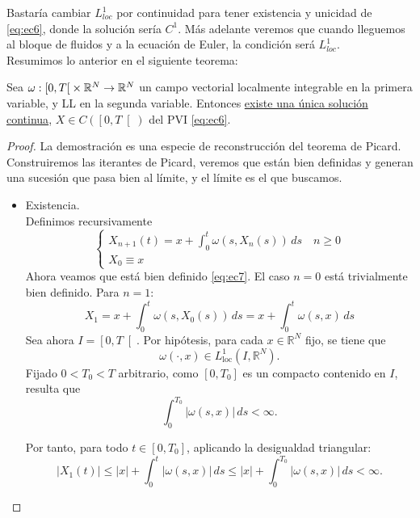 Bastaría cambiar $L^1_{loc}$ por continuidad para tener existencia y unicidad de \eqref{eq:ec6}, donde la solución sería $C^1$. Más adelante 
veremos que cuando lleguemos al bloque de fluidos y a la ecuación de Euler, la condición será $L^1_{loc}$. \\

Resumimos lo anterior en el siguiente teorema:

\begin{teo}
    Sea $\omega : \left[ 0, T \right[ \times \mathbb{R}^N \to \mathbb{R}^N$ un campo vectorial localmente integrable en la primera variable, y LL en la segunda variable.
    Entonces \underline{existe una única solución continua}, $X \in C(\left[0, T \right[)$ del PVI \eqref{eq:ec6}. 
\end{teo}


\begin{proof}
    La demostración es una especie de reconstrucción del teorema de Picard. Construiremos las iterantes de Picard, veremos que están bien definidas
    y generan una sucesión que pasa bien al límite, y el límite es el que buscamos. \\

    \begin{itemize}
        \item[(i)] Existencia. \\
        
        Definimos recursivamente
        \begin{equation}\label{eq:ec7}
            \begin{cases}
                X_{n+1}(t) = x + \displaystyle\int_{0}^{t} \omega(s,X_n(s))\,ds \quad n \geq 0 \\
                X_0 \equiv x
            \end{cases}
        \end{equation}
        Ahora veamos que está bien definido \eqref{eq:ec7}. El caso $n=0$ está trivialmente bien definido. Para $n=1$:
        $$X_1 = x + \displaystyle\int_{0}^{t} \omega(s,X_0(s))\,ds = x + \displaystyle\int_{0}^{t} \omega(s,x)\,ds$$
        Sea ahora $I=\left[0,T\right[$. Por hipótesis, para cada $x\in\mathbb{R}^N$
        fijo, se tiene que
        \[
        \omega(\cdot,x)\in L^1_{\mathrm{loc}}(I,\mathbb{R}^N).
        \]
        Fijado $0<T_0<T$ arbitrario, como $[0,T_0]$ es un
        compacto contenido en $I$, resulta que
        \[
        \int_0^{T_0}|\omega(s,x)|\,ds<\infty.
        \]

        Por tanto, para todo $t\in[0,T_0]$, aplicando la
        desigualdad triangular:
        \[
        |X_1(t)|\leq |x|+\int_0^t|\omega(s,x)|\,ds
        \leq |x|+\int_0^{T_0}|\omega(s,x)|\,ds<\infty.
        \]


\end{itemize}
\end{proof}
